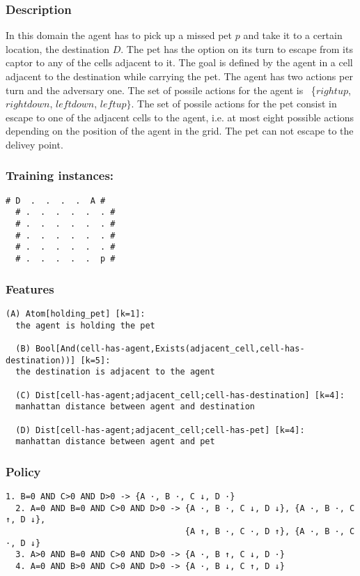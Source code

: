 \documentclass[a4paper]{article}
\begin{document}
\subsubsection{Description}

In this domain the agent has to pick up a missed pet $p$ and take it to a certain location, the destination $D$. The pet has the option on its turn to escape from its captor to any of the cells adjacent to it. The goal is defined by the agent in a cell adjacent to the destination while carrying the pet. The agent has two actions per turn and the adversary one. The set of possile actions for the agent is ~\{$rightup$, $rightdown$, $leftdown$, $leftup\}$.  The set of possile actions for the pet consist in escape to one of the adjacent cells to the agent, i.e. at most eight possible actions depending on the position of the agent in the grid. The pet can not escape to the delivey point.

\subsubsection{Training instances:}
\begin{Verbatim}[fontsize=\footnotesize]
  # D  .  .  .  .  A #
  # .  .  .  .  .  . #
  # .  .  .  .  .  . #
  # .  .  .  .  .  . #
  # .  .  .  .  .  . #
  # .  .  .  .  .  p #
\end{Verbatim}

\subsubsection{Features}
\begin{Verbatim}[fontsize=\footnotesize]
  (A) Atom[holding_pet] [k=1]:
  the agent is holding the pet

  (B) Bool[And(cell-has-agent,Exists(adjacent_cell,cell-has-destination))] [k=5]:
  the destination is adjacent to the agent

  (C) Dist[cell-has-agent;adjacent_cell;cell-has-destination] [k=4]:
  manhattan distance between agent and destination

  (D) Dist[cell-has-agent;adjacent_cell;cell-has-pet] [k=4]:
  manhattan distance between agent and pet
\end{Verbatim}

\subsubsection{Policy}
\begin{Verbatim}[fontsize=\footnotesize]
  1. B=0 AND C>0 AND D>0 -> {A ·, B ·, C ↓, D ·}
  2. A=0 AND B=0 AND C>0 AND D>0 -> {A ·, B ·, C ↓, D ↓}, {A ·, B ·, C ↑, D ↓},
                                    {A ↑, B ·, C ·, D ↑}, {A ·, B ·, C ·, D ↓}
  3. A>0 AND B=0 AND C>0 AND D>0 -> {A ·, B ↑, C ↓, D ·}
  4. A=0 AND B>0 AND C>0 AND D>0 -> {A ·, B ↓, C ↑, D ↓}

\end{Verbatim}
\end{document}
